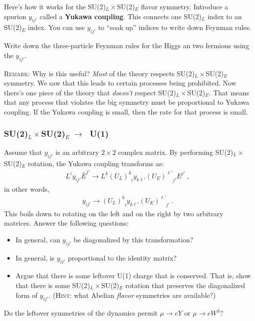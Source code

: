 \documentclass[12pt]{article}
\begin{document}
Here's how it works for the SU(2)$_L\times$SU(2)$_E$ flavor symmetry. Introduce a spurion $y_{ij'}$ called a \textbf{Yukawa coupling}. This connects one SU(2)$_L$ index to an SU(2)$_E$ index. You can use $y_{ij'}$ to ``soak up'' indices to write down Feynman rules.

Write down the three-particle Feynman rules for the Higgs an two fermions using the $y_{ij'}$. 

\textsc{Remark}: Why is this useful? \emph{Most} of the theory respects SU(2)$_L\times$SU(2)$_E$ symmetry. We saw that this leads to certain processes being prohibited. Now there's one piece of the theory that \emph{doesn't} respect SU(2)$_L\times$SU(2)$_E$. That means that any process that violates the big symmetry must be proportional to Yukawa coupling. If the Yukawa coupling is small, then the rate for that process is small. 


\subsubsection{SU(2)$_L\times$SU(2)$_E \;\to\; $ U(1)}

Assume that $y_{ij'}$ is an arbitrary $2\times 2$ complex matrix. By performing SU(2)$_L\times$SU(2)$_E$ rotation, the Yukawa coupling transforms as:
\begin{align}
	L^i y_{ij'}\bar E^{j'} \to L^k (U_L)^k_{\phantom k i} y_{k\ell'} (U_E)^{\ell'}_{\phantom{\ell'} j'} E^{j'} \ ,
\end{align}
in other words, 
\begin{align}
	y_{ij'} \to (U_L)^k_{\phantom k i} y_{k\ell'} (U_E)^{\ell'}_{\phantom{\ell'} j'} \ .
\end{align}
This boils down to rotating on the left and on the right by two arbitrary matrices. Answer the following questions:
\begin{itemize}
	\item In general, can $y_{ij'}$ be diagonalized by this transformation?
	\item In general, is $y_{ij'}$ proportional to the identity matrix?
	\item Argue that there is some leftover U(1) charge that is conserved. That is, show that there is some SU(2)$_L\times$SU(2)$_E$ rotation that preserves the diagonalized form of $y_{ij'}$. (\textsc{Hint}: what Abelian \emph{flavor} symmetries are available?)
\end{itemize}

Do the leftover symmetries of the dynamics permit $\mu\to e Y$ or $\mu \to e W^3$?
\end{document}
